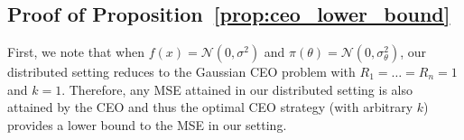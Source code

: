 \documentclass[letterpaper, 11pt]{IEEEtran}      %
\newcommand{\Ncal}{\mathcal{N}}
\begin{document}


\onecolumn 

\appendix

\section{}

\subsection{Proof of Proposition~\ref{prop:ceo_lower_bound}
\label{app:proof:prop_ceo_lower_bound}}

First, we note that when $f(x) = \Ncal(0,\sigma^2)$ and $\pi(\theta) = \Ncal(0,\sigma_\theta^2)$, our distributed setting reduces to the Gaussian CEO problem with $R_1=\ldots = R_n =1$ and $k=1$. Therefore, any MSE attained in our distributed setting is also attained by the CEO and thus the optimal CEO strategy (with arbitrary $k$) provides a lower bound to the MSE in our setting. \\
\end{document}
